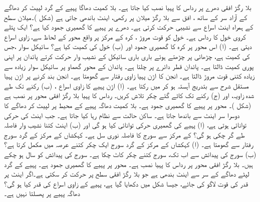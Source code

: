 بلا رگڑ افقی دھرے پر  رداس کا پہیا نصب کیا جاتا ہے۔ بلا کمیت دھاگا پہیے کے گرد لپیٹ کر دھاگے کے آزاد سر کے ساتھ ، افق سے    بلا رگڑ  میلان  پر رکھی،  اینٹ باندھی  جاتی ہے (شکل )۔میلان سطح  کے ہمراہ     اینٹ   اسراع سے نشیبی  حرکت کرتی   ہے۔  دھرے  پر پہیے کا گھمیری جمود کیا ہے؟
ایک پتلے کروی خول کا رداس  ہے۔ خول کو  قوت مروڑ ، کرہ کے مرکز پر واقع محور کے لحاظ سے، زاوی  اسراع دیتی ہے۔ (ا) اس محور پر کرہ کا گھمیری جمود  اور (ب) خول کی کمیت کیا ہے؟
سائیکل  سوار ،جس کی کمیت  ہے،  چڑھائی  پر  چڑھتے ہوئے  باری باری سائیکل کے نشیب وار حرکت کرتے  پائدان  پر اپنی   پوری کمیت  ڈالتا ہے۔ پائدان      قطر   دائرے پر چلتا ہے۔ پائدان کے محور گھماو پر سائیکل سوار زیادہ سے زیادہ کتنی قوت مروڑ ڈالتا ہے۔
انجن کا اڑن پہیا  زاوی رفتار سے گھومتا ہے۔ انجن بند کرنے پر اڑن پہیا مستقل شرح سے بتدریج  آہستہ ہو کر  میں رکتا ہے۔ (ا)  اڑن پہیے کا زاوی اسراع ، (ب)  رکنے تک طے شدہ زاویہ، اور (ج) رکنے تک کاٹے گئے چکر تلاش کریں۔
رداس  کا پہیا بلا رگڑ افقی محور پر نصب ہے (شکل )۔  محور پر پہیے  کا گھمیری جمود  ہے۔ بلا کمیت دھاگہ  پہیے کے محیط پر لپیٹ کر  دھاگے کا دوسرا سر  اینٹ سے باندھا جاتا ہے۔ ساکن حالت سے نظام رہا کیا جاتا ہے۔ جب اینٹ کی حرکی توانائی   ہوتی ہے، (ا) پہیے کی گھمیری حرکی توانائی کیا ہو گی  اور (ب)  اینٹ کتنا  نشیب وار فاصلہ طے گر چکی ہو گی؟
 کے مرکز سے  سورج  کا فاصلہ  نوری سل ہے۔  کہکشاں کے مرکز کے گرد سورج  رفتار سے  گھومتا ہے۔ (ا)  کہکشاں کے مرکز کے گرد سورج ایک چکر کتنے عرصہ میں مکمل کرتا ہے؟ (ب)  سورج کی پیدائش سے اب تک، سورج کتنے چکر کاٹ چکا ہے۔ سورج کی پیدائش کو   سال  ہو چکے ہیں۔
بلا رگڑ افقی محور پر رداس   کا پہیا نصب ہے۔ محور پر پہیے کا گھمیری جمود  ہے۔ پہیے کے  گرد لپٹے  دھاگے کے سر سے  اینٹ بندھی ہے جو بلا رگڑ افقی سطح پر حرکت کر سکتی ہے۔اگر اینٹ پر  قدر کی قوت لاگو کی جائے، جیسا شکل  میں دکھایا گیا ہے، پہیے کے زاوی اسراع کی قدر کیا ہو گی؟ دھاگہ پہیے پر پھسلتا نہیں ہے۔
